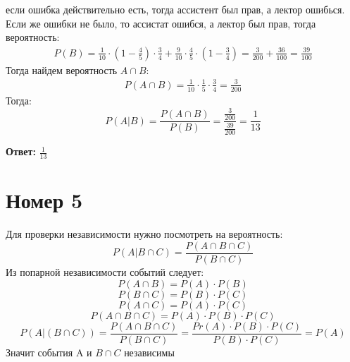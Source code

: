 если ошибка действительно есть, тогда ассистент был прав, а лектор ошибься. Если же ошибки не было, то ассистат ошибся, а лектор был прав, тогда вероятность:
\begin{equation*}
\begin{gathered}
P(B) = \frac{1}{10} \cdot (1 - \frac{4}{5}) \cdot \frac{3}{4} + \frac{9}{10} \cdot \frac{4}{5} \cdot ( 1 - \frac{3}{4}) = \frac{3}{200} + \frac{36}{100} = \frac{39}{100}
\end{gathered}
\end{equation*}
Тогда найдем вероятность $A \cap B$:
\begin{equation*}
\begin{gathered}
P(A \cap B) = \frac{1}{10} \cdot \frac{1}{5} \cdot \frac{3}{4}  = \frac{3}{200}
\end{gathered}
\end{equation*}
Тогда:
\[
P(A|B) = \frac{P(A \cap B)}{P(B)} = \frac{\frac{3}{200}}{\frac{39}{200}} = \frac{1}{13}
\]
\begin{center}
\textbf{Ответ: } $\frac{1}{13}$
\end{center}















\section*{Номер 5}
Для проверки независимости нужно посмотреть на вероятность:
\[
P(A|B \cap C) = \frac{P(A \cap B \cap C)}{P(B \cap C)}
\]
Из попарной независимости событий следует:
\[
P(A \cap B) = P(A) \cdot P(B)
\]
\[
P(B \cap C) = P(B) \cdot P(C)
\]
\[
P(A \cap C) = P(A) \cdot P(C)
\]
\[
P(A\cap B\cap C) = P(A) \cdot P(B) \cdot P(C)
\]
\[
P(A|(B \cap C)) = \frac{P(A \cap B \cap C)}{P(B \cap C)} = \frac{Pr(A) \cdot P(B) \cdot P(C)}{P(B) \cdot P(C)} = P(A)
\]
Значит события A и $B \cap C$ независимы
